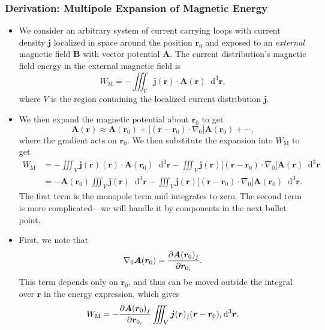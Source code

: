 \documentclass[11pt, a4paper]{article}
\newcommand{\diff}{\mathop{}\!\mathrm{d}} %
\newcommand{\dr}{\diff^{3} \r}  %
\renewcommand{\vec}[1]{\bm{#1}} %
\renewcommand{\r}{\vec{r}}
\newcommand{\B}{\vec{B}} %
\newcommand{\A}{\vec{A}} %
\renewcommand{\j}{\vec{j}}  %
\renewcommand{\grad}{\nabla}
\begin{document}
\subsubsection{Derivation: Multipole Expansion of Magnetic Energy}
\begin{itemize}
	\item We consider an arbitrary system of current carrying loops with current density $ \j $ localized in space around the position $ \r_{0} $ and exposed to an \textit{external} magnetic field $ \B $ with vector potential $ \A $. The current distribution's magnetic field energy in the external magnetic field is
	\begin{equation*}
		W_{\text{M}} = - \iiint_{V} \j(\r) \cdot \A(\r) \dr,
	\end{equation*}
	where $ V $ is the region containing the localized current distribution $ \j $. 
	
	\item We then expand the magnetic potential about $ \r_{0} $ to get
	\begin{equation*}
		\A(\r) \approx \A(\r_{0}) + \big[(\r - \r_{0}) \cdot \grad_{0}\big] \A(\r_{0}) + \cdots,
	\end{equation*}
	where the gradient acts on $ \r_{0} $. We then substitute the expansion into $ W_{\text{M}} $ to get
	\begin{align*}
		W_{\text{M}} &= - \iiint_{V}\j(\r) (\r)\cdot \A(\r_{0}) \dr - \iiint_{V} \j(\r) \big[(\r - \r_{0}) \cdot \grad_{0}\big] \A(\r) \dr\\
		& = - \A(\r_{0})\iiint_{V} \j(\r)\dr - \iiint_{V} \j(\r)\big[(\r - \r_{0})\cdot \grad_{0}\big] \A(\r_{0})\dr.
	\end{align*}
	The first term is the monopole term and integrates to zero. The second term is more complicated---we will handle it by components in the next bullet point.

    \item First, we note that
	\begin{equation*}
		\grad_{0} \A(\r_{0}) = \pdv{\A(\r_{0})_{j}}{\r_{0_{i}}}.
	\end{equation*}
	This term depends only on $ \r_{0} $, and thus can be moved outside the integral over $ \r $ in the energy expression, which gives
    \begin{equation*}
        W_{\text{M}} = - \pdv{\A(\r_{0})_{j}}{\r_{0_{i}}} \iiint_{V} \j(\r)_{j} (\r - \r_{0})_{i} \dr.
    \end{equation*}
    

\end{itemize}
\end{document}
